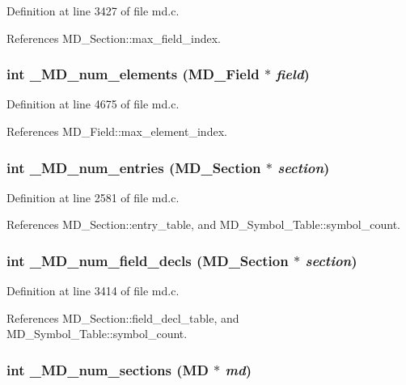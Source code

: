 Definition at line 3427 of file md.c.

References MD\_\-Section::max\_\-field\_\-index.
\subsubsection{\setlength{\rightskip}{0pt plus 5cm}int \_\-MD\_\-num\_\-elements (\bf{MD\_\-Field} $\ast$ {\em field})}\label{md_8c_7c591f0f380fc4ed36172e5c7899d831}




Definition at line 4675 of file md.c.

References MD\_\-Field::max\_\-element\_\-index.
\subsubsection{\setlength{\rightskip}{0pt plus 5cm}int \_\-MD\_\-num\_\-entries (\bf{MD\_\-Section} $\ast$ {\em section})}\label{md_8c_53bb3a6d3dc32c0b516ce53f754e9883}




Definition at line 2581 of file md.c.

References MD\_\-Section::entry\_\-table, and MD\_\-Symbol\_\-Table::symbol\_\-count.
\subsubsection{\setlength{\rightskip}{0pt plus 5cm}int \_\-MD\_\-num\_\-field\_\-decls (\bf{MD\_\-Section} $\ast$ {\em section})}\label{md_8c_d6c49bb99aa6ccf2592fd5d82ca02f73}




Definition at line 3414 of file md.c.

References MD\_\-Section::field\_\-decl\_\-table, and MD\_\-Symbol\_\-Table::symbol\_\-count.
\subsubsection{\setlength{\rightskip}{0pt plus 5cm}int \_\-MD\_\-num\_\-sections (\bf{MD} $\ast$ {\em md})}\label{md_8c_46121d9a23458a3803dc0bcb64ef2197}




